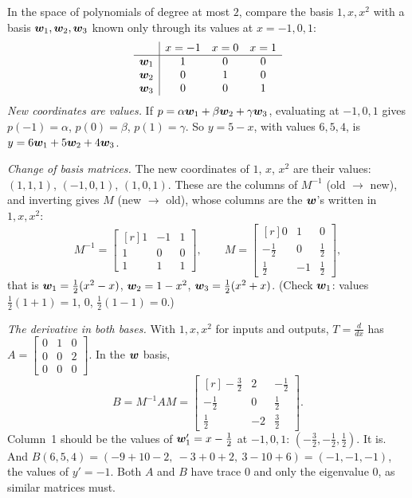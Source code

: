 \begin{example}\label{ex:u35-lagrange}
In the space of polynomials of degree at most $2$, compare the basis $1,x,x^2$ with a basis
$\boldsymbol{w}_1,\boldsymbol{w}_2,\boldsymbol{w}_3$ known only through its values at $x=-1,0,1$:
\[
  \begin{array}{c|ccc}
    & x=-1 & x=0 & x=1\\\hline
    \boldsymbol{w}_1 & 1&0&0\\ \boldsymbol{w}_2&0&1&0\\ \boldsymbol{w}_3&0&0&1
  \end{array}
\]
\emph{New coordinates are values.} If $p=\alpha\boldsymbol{w}_1+\beta\boldsymbol{w}_2+\gamma\boldsymbol{w}_3$, evaluating at $-1,0,1$ gives
$p(-1)=\alpha$, $p(0)=\beta$, $p(1)=\gamma$. So $y=5-x$, with values $6,5,4$, is $y=6\boldsymbol{w}_1+5\boldsymbol{w}_2+4\boldsymbol{w}_3$.

\emph{Change of basis matrices.} The new coordinates of $1$, $x$, $x^2$ are their values:
$(1,1,1)$, $(-1,0,1)$, $(1,0,1)$. These are the columns of $M^{-1}$ (old $\to$ new), and inverting
gives $M$ (new $\to$ old), whose columns are the $\boldsymbol{w}$'s written in $1,x,x^2$:
\[
  M^{-1}=\begin{bmatrix*}[r]1&-1&1\\1&0&0\\1&1&1\end{bmatrix*},\qquad
  M=\begin{bmatrix*}[r]0&1&0\\-\tfrac12&0&\tfrac12\\\tfrac12&-1&\tfrac12\end{bmatrix*},
\]
that is $\boldsymbol{w}_1=\tfrac12(x^2-x)$, $\boldsymbol{w}_2=1-x^2$, $\boldsymbol{w}_3=\tfrac12(x^2+x)$. (Check $\boldsymbol{w}_1$: values
$\tfrac12(1+1)=1$, $0$, $\tfrac12(1-1)=0$.)

\emph{The derivative in both bases.} With $1,x,x^2$ for inputs and outputs, $T=\frac{d}{dx}$ has
$A=\left[\begin{smallmatrix}0&1&0\\0&0&2\\0&0&0\end{smallmatrix}\right]$. In the $\boldsymbol{w}$ basis,
\[
  B=M^{-1}AM=\begin{bmatrix*}[r]-\tfrac32&2&-\tfrac12\\-\tfrac12&0&\tfrac12\\\tfrac12&-2&\tfrac32\end{bmatrix*}.
\]
Column~1 should be the values of $\boldsymbol{w}_1'=x-\tfrac12$ at $-1,0,1$: $(-\tfrac32,-\tfrac12,\tfrac12)$. It is.
And $B(6,5,4)=(-9+10-2,\ -3+0+2,\ 3-10+6)=(-1,-1,-1)$, the values of $y'=-1$. Both $A$ and $B$ have
trace $0$ and only the eigenvalue $0$, as similar matrices must.
\end{example}

